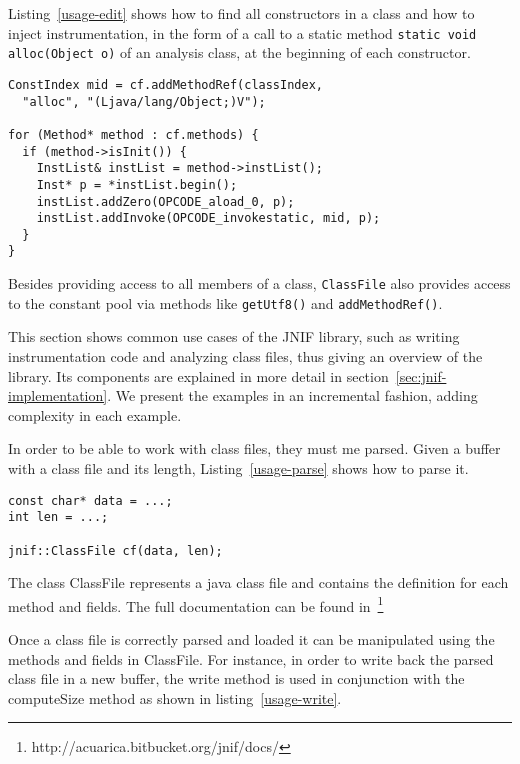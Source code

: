 Listing~\ref{usage-edit} shows how to find all constructors in a class
and how to inject instrumentation, in the form of a call to a static method
\texttt{static void alloc(Object o)} of an analysis class,
at the beginning of each constructor.

\begin{lstlisting}[caption=Instrumenting constructor entries,label=usage-edit]
ConstIndex mid = cf.addMethodRef(classIndex, 
  "alloc", "(Ljava/lang/Object;)V");

for (Method* method : cf.methods) {
  if (method->isInit()) {
    InstList& instList = method->instList();
    Inst* p = *instList.begin();
    instList.addZero(OPCODE_aload_0, p);
    instList.addInvoke(OPCODE_invokestatic, mid, p);
  }
}
\end{lstlisting}

Besides providing access to all members of a class,
\texttt{ClassFile} also provides access to the constant pool
via methods like \texttt{getUtf8()} and \texttt{addMethodRef()}.



This section shows common use cases of the JNIF library, 
such as writing instrumentation code and analyzing class files, 
thus giving an overview of the library. 
Its components are explained in more detail in section~\ref{sec:jnif-implementation}.
We present the examples in an incremental fashion, adding complexity in each example.

In order to be able to work with class files, they must me parsed. 
Given a buffer with a class file and its length, Listing~\ref{usage-parse} shows how to parse it.

\begin{lstlisting}[caption=Decoding a class,label=usage-parse]
const char* data = ...;
int len = ...;

jnif::ClassFile cf(data, len);
\end{lstlisting}

The class ClassFile represents a java class file and contains the definition for each method and fields. 
The full documentation can be found in~\footnote{http://acuarica.bitbucket.org/jnif/docs/}

Once a class file is correctly parsed and loaded it can be manipulated using the methods and fields in ClassFile. 
For instance, in order to write back the parsed class file in a new buffer, 
the write method is used in conjunction with the computeSize method as shown in listing~\ref{usage-write}.

